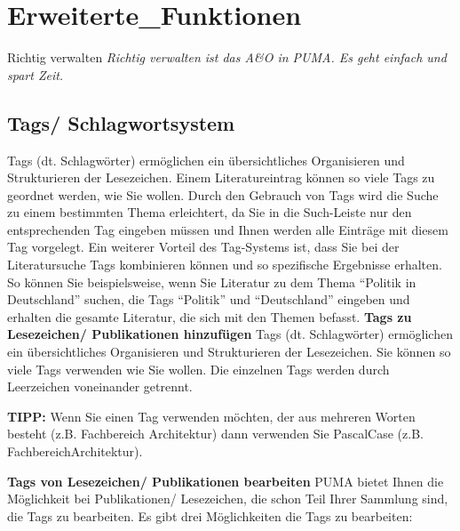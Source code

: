 \section{Erweiterte_Funktionen}
Richtig verwalten
\textit{Richtig verwalten ist das A\&O in PUMA. Es geht einfach und spart Zeit.}
\subsection{Tags/ Schlagwortsystem}
Tags (dt. Schlagwörter) ermöglichen ein übersichtliches Organisieren und Strukturieren der Lesezeichen. Einem Literatureintrag können so viele Tags zu geordnet werden, wie Sie wollen. Durch den Gebrauch von Tags wird die Suche zu einem bestimmten Thema erleichtert, da Sie in die Such-Leiste nur den entsprechenden Tag eingeben müssen und Ihnen werden alle Einträge mit diesem Tag vorgelegt. Ein weiterer Vorteil des Tag-Systems ist, dass Sie bei der Literatursuche  Tags kombinieren können und so spezifische Ergebnisse erhalten. So können Sie beispielsweise, wenn Sie Literatur zu dem Thema \enquote{Politik in Deutschland} suchen, die Tags \enquote{Politik} und \enquote{Deutschland} eingeben und erhalten die gesamte Literatur, die sich mit den Themen befasst. 
\newline
\newline
\textbf{Tags zu Lesezeichen/ Publikationen hinzufügen}\newline
Tags (dt. Schlagwörter) ermöglichen ein übersichtliches Organisieren und Strukturieren der Lesezeichen. Sie können so viele Tags verwenden wie Sie wollen. Die einzelnen Tags werden durch Leerzeichen voneinander getrennt. 
\begin{shaded}
\centering \textbf{TIPP:} Wenn Sie einen Tag verwenden möchten, der aus mehreren Worten besteht (z.B. Fachbereich Architektur) dann verwenden Sie PascalCase (z.B. FachbereichArchitektur). 
\end{shaded}
\textbf{Tags von Lesezeichen/ Publikationen bearbeiten} \newline
PUMA bietet Ihnen die Möglichkeit bei Publikationen/ Lesezeichen, die schon Teil Ihrer Sammlung sind, die Tags zu bearbeiten. Es gibt drei Möglichkeiten die Tags zu bearbeiten:
